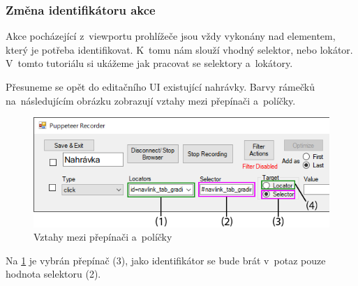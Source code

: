 \documentclass[12pt, a4paper, twoside]{article}
\begin{document}
	\subsubsection{Změna identifikátoru akce}
	Akce pocházející z~viewportu prohlížeče jsou vždy vykonány nad elementem, který je potřeba identifikovat. K~tomu nám slouží vhodný selektor, nebo lokátor. V~tomto tutoriálu si ukážeme jak pracovat se selektory a~lokátory.
	
	Přesuneme se opět do editačního UI existující nahrávky. Barvy rámečků na~následujícím obrázku zobrazují vztahy mezi přepínači a~políčky.
	\nopagebreak
	\begin{figure}[H]
		\centering
		\includegraphics[width=1.0\textwidth]{identifiers2.png}
		\caption{Vztahy mezi přepínači a~políčky}
		\label{fig:identifierRelationship}
	\end{figure}
	Na \cref{fig:identifierRelationship} je vybrán přepínač (3), jako identifikátor se bude brát v~potaz pouze hodnota selektoru (2).
	
\end{document}
